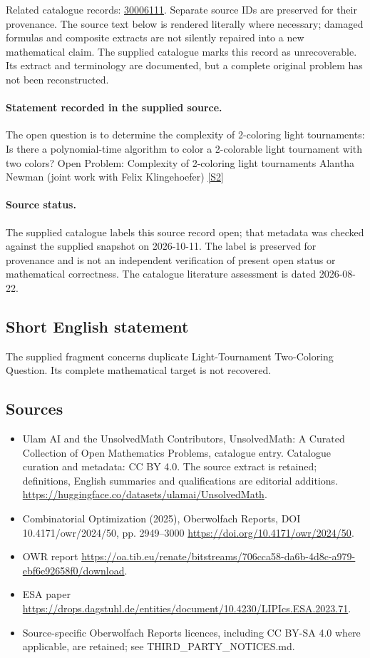 \documentclass[11pt]{article}
\begin{document}
Related catalogue records: \href{https://mehmetmars7.github.io/Erdosproblems-llm-hunter/problem.html?type=open_problems&id=30006111}{30006111}. Separate source IDs are preserved for their provenance.
The source text below is rendered literally where necessary; damaged formulas and composite extracts are not silently repaired into a new mathematical claim.
The supplied catalogue marks this record as unrecoverable. Its extract and terminology are documented, but a complete original problem has not been reconstructed.
\paragraph{Statement recorded in the supplied source.}
The open question is to determine the complexity of 2-coloring light tournaments: Is there a polynomial-time algorithm to color a 2-colorable light tournament with two colors? Open Problem: Complexity of 2-coloring light tournaments Alantha Newman (joint work with Felix Klingehoefer) \href{https://doi.org/10.4171/owr/2024/50}{[S2]}
\paragraph{Source status.}
The supplied catalogue labels this source record open; that metadata was checked against the supplied snapshot on 2026-10-11. The label is preserved for provenance and is not an independent verification of present open status or mathematical correctness. The catalogue literature assessment is dated 2026-08-22.
\subsection{Short English statement}
The supplied fragment concerns duplicate Light-Tournament Two-Coloring Question. Its complete mathematical target is not recovered.
\subsection{Sources}
\begin{itemize}
\item[S1] Ulam AI and the UnsolvedMath Contributors, UnsolvedMath: A Curated Collection of Open Mathematics Problems, catalogue entry. Catalogue curation and metadata: CC BY 4.0. The source extract is retained; definitions, English summaries and qualifications are editorial additions.
\url{https://huggingface.co/datasets/ulamai/UnsolvedMath}.
\item[S2] Combinatorial Optimization (2025), Oberwolfach Reports, DOI 10.4171/owr/2024/50, pp. 2949--3000
\url{https://doi.org/10.4171/owr/2024/50}.
\item[S3] OWR report
\url{https://oa.tib.eu/renate/bitstreams/706cca58-da6b-4d8c-a979-ebf6e92658f0/download}.
\item[S4] ESA paper
\url{https://drops.dagstuhl.de/entities/document/10.4230/LIPIcs.ESA.2023.71}.
\item Source-specific Oberwolfach Reports licences, including CC BY-SA 4.0 where applicable, are retained; see THIRD\_PARTY\_NOTICES.md.
\end{itemize}
\end{document}
